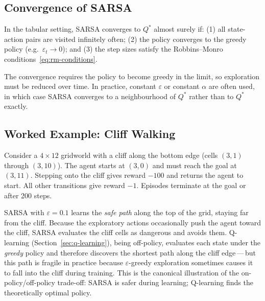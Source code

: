 \subsection{Convergence of SARSA}

\begin{theorem}
In the tabular setting, SARSA converges to $Q^*$ almost surely if: (1) all state-action pairs are visited infinitely often; (2) the policy converges to the greedy policy (e.g.\ $\varepsilon_t \to 0$); and (3) the step sizes satisfy the Robbins--Monro conditions~\eqref{eq:rm-conditions}.
\end{theorem}

The convergence requires the policy to become greedy in the limit, so exploration must be reduced over time.  In practice, constant $\varepsilon$ or constant $\alpha$ are often used, in which case SARSA converges to a neighbourhood of $Q^*$ rather than to $Q^*$ exactly.

\subsection{Worked Example: Cliff Walking}

\begin{example}
\label{ex:cliff-walking}
Consider a $4 \times 12$ gridworld with a cliff along the bottom edge (cells $(3,1)$ through $(3,10)$).  The agent starts at $(3,0)$ and must reach the goal at $(3,11)$.  Stepping onto the cliff gives reward $-100$ and returns the agent to start.  All other transitions give reward $-1$.  Episodes terminate at the goal or after 200 steps.

SARSA with $\varepsilon=0.1$ learns the \emph{safe path} along the top of the grid, staying far from the cliff.  Because the exploratory actions occasionally push the agent toward the cliff, SARSA evaluates the cliff cells as dangerous and avoids them.  Q-learning (Section~\ref{sec:q-learning}), being off-policy, evaluates each state under the \emph{greedy} policy and therefore discovers the shortest path along the cliff edge\,---\,but this path is fragile in practice because $\varepsilon$-greedy exploration sometimes causes it to fall into the cliff during training.  This is the canonical illustration of the on-policy/off-policy trade-off: SARSA is safer during learning; Q-learning finds the theoretically optimal policy.
\end{example}

